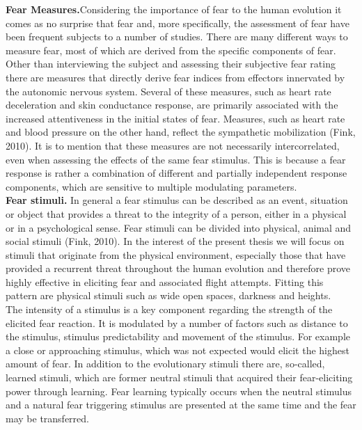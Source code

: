 \textbf{Fear Measures.}Considering the importance of fear to the human evolution it comes as no surprise that fear and, more specifically, the assessment of fear have been frequent subjects to a number of studies. There are many different ways to measure fear, most of which are derived from the specific components of fear. Other than interviewing the subject and assessing their subjective fear rating there are measures that directly derive fear indices from effectors innervated by the autonomic nervous system. Several of these measures, such as heart rate deceleration and skin conductance response, are primarily associated with the increased attentiveness in the initial states of fear. Measures, such as heart rate and blood pressure on the other hand, reflect the sympathetic mobilization (Fink, 2010). It is to mention that these measures are not necessarily intercorrelated, even when assessing the effects of the same fear stimulus. This is because a fear response is rather a combination of different and partially independent response components, which are sensitive to multiple modulating parameters.\\

\textbf{Fear stimuli.} In general a fear stimulus can be described as an event, situation or object that provides a threat to the integrity of a person, either in a physical or in a psychological sense. Fear stimuli can be divided into physical, animal and social stimuli (Fink, 2010). In the interest of the present thesis we will focus on stimuli that originate from the physical environment, especially those that have provided a recurrent threat throughout the human evolution and therefore prove highly effective in eliciting fear and associated flight attempts. Fitting this pattern are physical stimuli such as wide open spaces, darkness and heights. \\
The intensity of a stimulus is a key component regarding the strength of the elicited fear reaction. It is modulated by a number of factors such as distance to the stimulus, stimulus predictability and movement of the stimulus. For example a close or approaching stimulus, which was not expected would elicit the highest amount of fear. In addition to the evolutionary stimuli there are, so-called, learned stimuli, which are former neutral stimuli that acquired their fear-eliciting power through learning. Fear learning typically occurs when the neutral stimulus and a natural fear triggering stimulus are presented at the same time and the fear may be transferred.

